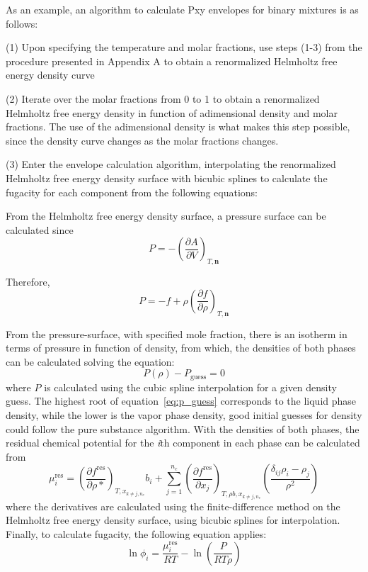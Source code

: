 \documentclass[preprint,12pt,3p]{elsarticle}
\begin{document}
\begin{appendices}
As an example, an algorithm to calculate Pxy envelopes for binary mixtures is as follows:

(1) Upon specifying the temperature and molar fractions, use steps (1-3) from the procedure presented in Appendix A to obtain a renormalized Helmholtz free energy density curve

(2) Iterate over the molar fractions from 0 to 1 to obtain a renormalized Helmholtz free energy density in function of adimensional density and molar fractions.
The use of the adimensional density is what makes this step possible, since the density curve changes as the molar fractions changes.

(3) Enter the envelope calculation algorithm, interpolating the renormalized Helmholtz free energy density surface with bicubic splines to calculate the fugacity for each component from the following equations:

From the Helmholtz free energy density surface, a pressure surface can be calculated since
\begin{equation} \label{eq:press_helm_deriv}
P = -\left(\frac{\partial A}{\partial V}\right)_{T,\textbf{n}}
\end{equation}

Therefore,
\begin{equation} \label{eq:press_helm_deriv2}
P = -f+\rho\left(\frac{\partial f}{\partial \rho}\right)_{T,\textbf{n}}
\end{equation}

From the pressure-surface, with specified mole fraction, there is an isotherm in terms of pressure in function of density, from which, the densities of both phases can be calculated solving the equation:
\begin{equation} \label{eq:p_guess}
P(\rho) - P_\mathrm{guess} = 0
\end{equation}
where $P$ is calculated using the cubic spline interpolation for a given density guess.
The highest root of equation~\ref{eq:p_guess} corresponds to the liquid phase density, while the lower is the vapor phase density, good initial guesses for density could follow the pure substance algorithm.
With the densities of both phases, the residual chemical potential for the \textit{i}th component in each phase can be calculated from
\begin{equation} \label{eq:chem_pot_i}
\mu_{i}^\mathrm{res} = \left(\frac{\partial f^\mathrm{res}}{\partial \rho{*}}\right)_{T,x_{k\neq j,n_c}}b_{i}+\sum_{j=1}^{n_c} \left(\frac{\partial f^\mathrm{res}}{\partial x_{j}}\right)_{T,\rho b,x_{k\neq j,n_c}} \left(\frac{\delta_{ij} \rho_{i}-\rho_{j}}{\rho^{2}}\right)
\end{equation} 
where the derivatives are calculated using the finite-difference method on the Helmholtz free energy density surface, using bicubic splines for interpolation.
Finally, to calculate fugacity, the following equation applies:
\begin{equation} \label{eq:fugacity}
\ln\phi_{i} = \frac{\mu_{i}^\mathrm{res}}{RT} - \ln\left(\frac{P}{RT\rho}\right)
\end{equation}


\end{appendices}
\end{document}
